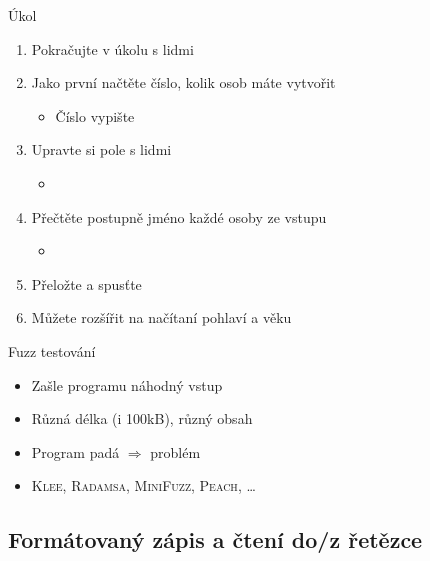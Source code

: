 \begin{frame}{Úkol}

  \begin{enumerate}
    \item Pokračujte v úkolu s lidmi
    \item Jako první načtěte číslo, kolik osob máte vytvořit
    \begin{itemize}
      \item Číslo vypište
    \end{itemize}

    \item Upravte si pole s lidmi
    \begin{itemize}
      \item {}
    \end{itemize}

    \item Přečtěte postupně jméno každé osoby ze vstupu
    \begin{itemize}
      \item {}
    \end{itemize}

    \item Přeložte a spusťte
    \item Můžete rozšířit na načítaní pohlaví a věku
  \end{enumerate}

\end{frame}

\begin{frame}{Fuzz testování}

  \begin{itemize}
    \item Zašle programu náhodný vstup
    \item Různá délka (i 100kB), různý obsah
    \item Program padá $\Rightarrow$ problém
    \item \textsc{Klee}, \textsc{Radamsa}, \textsc{MiniFuzz}, \textsc{Peach},
      \dots
  \end{itemize}

\end{frame}

\subsection*{Formátovaný zápis a čtení do/z řetězce}
\frame{\subsectionpage}

